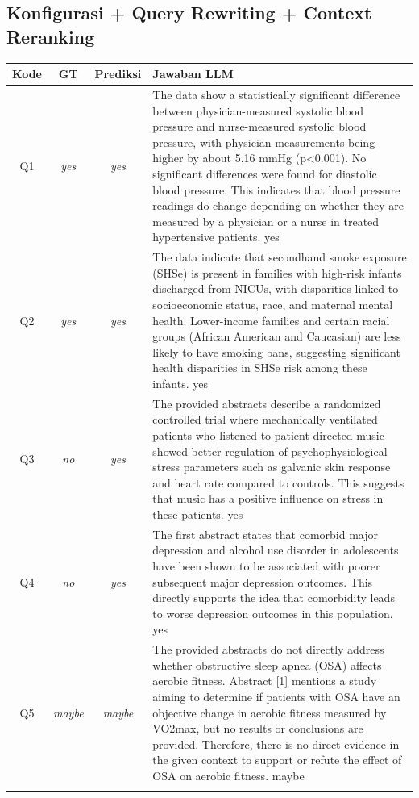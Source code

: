 \subsection*{Konfigurasi + Query Rewriting + Context Reranking}
\begin{longtable}{@{}c c c >{\raggedright\arraybackslash}p{8.8cm}@{}}
\toprule
\textbf{Kode} & \textbf{GT} & \textbf{Prediksi} & \textbf{Jawaban LLM} \\
\midrule\endhead
Q1 & \textit{yes} & \textit{yes} & The data show a statistically significant difference between physician-measured systolic blood pressure and nurse-measured systolic blood pressure, with physician measurements being higher by about 5.16 mmHg (p<0.001). No significant differences were found for diastolic blood pressure. This indicates that blood pressure readings do change depending on whether they are measured by a physician or a nurse in treated hypertensive patients. yes \\
\addlinespace
Q2 & \textit{yes} & \textit{yes} & The data indicate that secondhand smoke exposure (SHSe) is present in families with high-risk infants discharged from NICUs, with disparities linked to socioeconomic status, race, and maternal mental health. Lower-income families and certain racial groups (African American and Caucasian) are less likely to have smoking bans, suggesting significant health disparities in SHSe risk among these infants. yes \\
\addlinespace
Q3 & \textit{no} & \textit{yes} & The provided abstracts describe a randomized controlled trial where mechanically ventilated patients who listened to patient-directed music showed better regulation of psychophysiological stress parameters such as galvanic skin response and heart rate compared to controls. This suggests that music has a positive influence on stress in these patients. yes \\
\addlinespace
Q4 & \textit{no} & \textit{yes} & The first abstract states that comorbid major depression and alcohol use disorder in adolescents have been shown to be associated with poorer subsequent major depression outcomes. This directly supports the idea that comorbidity leads to worse depression outcomes in this population. yes \\
\addlinespace
Q5 & \textit{maybe} & \textit{maybe} & The provided abstracts do not directly address whether obstructive sleep apnea (OSA) affects aerobic fitness. Abstract [1] mentions a study aiming to determine if patients with OSA have an objective change in aerobic fitness measured by VO2max, but no results or conclusions are provided. Therefore, there is no direct evidence in the given context to support or refute the effect of OSA on aerobic fitness. maybe \\
\addlinespace
\bottomrule
\end{longtable}

